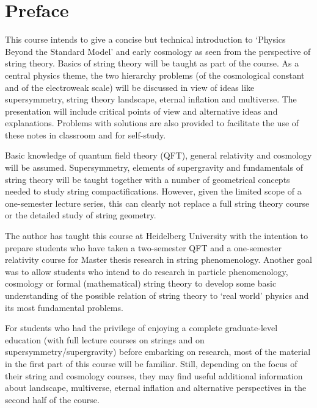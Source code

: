 \documentclass[12pt]{article}
\numberwithin{equation}{section}
\begin{document}
\section*{Preface}
This course intends to give a concise but technical introduction to `Physics Beyond the Standard Model' and early cosmology as seen from the perspective of string theory. Basics of string theory will be taught as part of the course. As a central physics theme, the two hierarchy problems (of the cosmological constant and of the electroweak scale) will be discussed in view of ideas like supersymmetry, string theory landscape, eternal inflation and multiverse. The presentation will include critical points of view and alternative ideas and explanations. Problems with solutions are also provided to facilitate the use of these notes in classroom and for self-study.

Basic knowledge of quantum field theory (QFT), general relativity and cosmology will be assumed. Supersymmetry, elements of supergravity and fundamentals of string theory will be taught together with a number of geometrical concepts needed to study string compactifications. However, given the limited scope of a one-semester lecture series, this can clearly not replace a full string theory course or the detailed study of string geometry.

The author has taught this course at Heidelberg University with the intention to prepare students who have taken a two-semester QFT and a one-semester relativity course for Master thesis research in string phenomenology. Another goal was to allow students who intend to do research in particle phenomenology, cosmology or formal (mathematical) string theory to develop some basic understanding of the possible relation of string theory to `real world' physics and its most fundamental problems.

For students who had the privilege of enjoying a complete graduate-level education (with full lecture courses on strings and on supersymmetry/supergravity) before embarking on research, most of the material in the first part of this course will be familiar. Still, depending on the focus of their string and cosmology courses, they may find useful additional information about landscape, multiverse, eternal inflation and alternative perspectives in the second half of the course.
\end{document}
